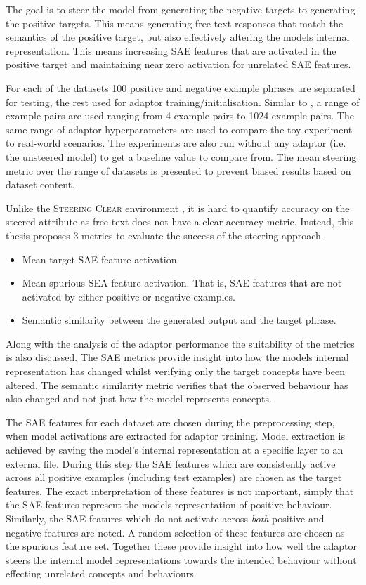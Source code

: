 The goal is to steer the model from generating the negative targets to generating the positive targets.
This means generating free-text responses that match the semantics of the positive target, but also effectively altering the models internal representation.
This means increasing SAE features that are activated in the positive target and maintaining near zero activation for unrelated SAE features.

For each of the datasets 100 positive and negative example phrases are separated for testing, the rest used for adaptor training/initialisation.
Similar to \citet{steering-clear}, a range of example pairs are used ranging from 4 example pairs to 1024 example pairs.
The same range of adaptor hyperparameters are used to compare the toy experiment to real-world scenarios.
The experiments are also run without any adaptor (i.e. the unsteered model) to get a baseline value to compare from.
The mean steering metric over the range of datasets is presented to prevent biased results based on dataset content.

 Unlike the {\scshape Steering Clear} environment , it is hard to quantify accuracy on the steered attribute as free-text does not have a clear accuracy metric.
Instead, this thesis proposes 3 metrics to evaluate the success of the steering approach.
\begin{itemize}[nolistsep]
    \item Mean target SAE feature activation.
    \item Mean spurious SEA feature activation. That is, SAE features that are not activated by either positive or negative examples.
    \item Semantic similarity between the generated output and the target phrase.
\end{itemize}
Along with the analysis of the adaptor performance the suitability of the metrics is also discussed.
The SAE metrics provide insight into how the models internal representation has changed whilst verifying only the target concepts have been altered.
The semantic similarity metric verifies that the observed behaviour has also changed and not just how the model represents concepts.

The SAE features for each dataset are chosen during the preprocessing step, when model activations are extracted for adaptor training.
Model extraction is achieved by saving the model's internal representation at a specific layer to an external file.
During this step the SAE features which are consistently active across all positive examples (including test examples) are chosen as the target features.
The exact interpretation of these features is not important, simply that the SAE features represent the models representation of positive behaviour.
Similarly, the SAE features which do not activate across \emph{both} positive and negative features are noted.
A random selection of these features are chosen as the spurious feature set.
Together these provide insight into how well the adaptor steers the internal model representations towards the intended behaviour without effecting unrelated concepts and behaviours.

